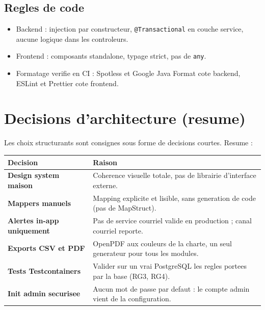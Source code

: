 \documentclass[11pt]{article}
\begin{document}
\subsection{Regles de code}
\begin{itemize}
  \item Backend : injection par constructeur, \texttt{@Transactional} en couche service, aucune logique dans les controleurs.
  \item Frontend : composants standalone, typage strict, pas de \texttt{any}.
  \item Formatage verifie en CI : Spotless et Google Java Format cote backend, ESLint et Prettier cote frontend.
\end{itemize}

\section{Decisions d'architecture (resume)}
Les choix structurants sont consignes sous forme de decisions courtes. Resume :
\begin{center}
\renewcommand{\arraystretch}{1.3}
\begin{tabularx}{\linewidth}{>{\bfseries}l Y}
\toprule
{} Decision & Raison \\
\midrule
Design system maison & Coherence visuelle totale, pas de librairie d'interface externe. \\
Mappers manuels & Mapping explicite et lisible, sans generation de code (pas de MapStruct). \\
Alertes in-app uniquement & Pas de service courriel valide en production ; canal courriel reporte. \\
Exports CSV et PDF & OpenPDF aux couleurs de la charte, un seul generateur pour tous les modules. \\
Tests Testcontainers & Valider sur un vrai PostgreSQL les regles portees par la base (RG3, RG4). \\
Init admin securisee & Aucun mot de passe par defaut : le compte admin vient de la configuration. \\
\bottomrule
\end{tabularx}
\end{center}

\end{document}
